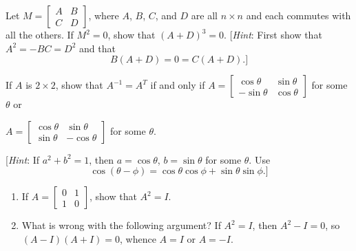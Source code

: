 \documentclass{ximera}
\begin{document}
\begin{problem}\label{prob:4.80}
Let $M = \left[ \begin{array}{rr}
A & B \\
C & D
\end{array} \right]$,
 where $A$, $B$, $C$, and $D$ are all $n \times n$ and each commutes with all the others. If $M^{2} = 0$, show that $(A + D)^{3} = 0$. [\textit{Hint}: First show that $A^{2} = -BC = D^{2}$ and that
\begin{equation*}
B(A + D) = 0 = C(A + D).]
\end{equation*}


\end{problem}

\begin{problem}\label{prob:4.81a}
If $A$ is $2 \times 2$, show that $A^{-1} = A^{T}$ if and only if $A = \left[ \begin{array}{rr}
\cos \theta & \sin \theta \\
-\sin \theta & \cos \theta
\end{array} \right]$
 for some $\theta$ or 
 
 $A = \left[ \begin{array}{rr}
 \cos \theta & \sin \theta \\
 \sin \theta & -\cos \theta
 \end{array} \right]$
 for some $\theta$.


[\textit{Hint}: If $a^{2} + b^{2} = 1$, then $a = \cos \theta$, $b = \sin \theta$ for some $\theta$. Use
\begin{equation*}
\cos(\theta - \phi) = \cos \theta \cos \phi + \sin \theta \sin \phi.]
\end{equation*}

\end{problem}

\begin{problem}\label{prob:4.81}

\begin{enumerate}
\item If $A = \left[ \begin{array}{rr}
0 & 1 \\
1 & 0
\end{array} \right]$,
 show that $A^{2} = I$.

\item What is wrong with the following argument? If $A^{2} = I$, then $A^{2} - I = 0$, so $(A - I)(A + I) = 0$, whence $A = I$ or $A = -I$.

\end{enumerate}
\end{problem}
\end{document}
